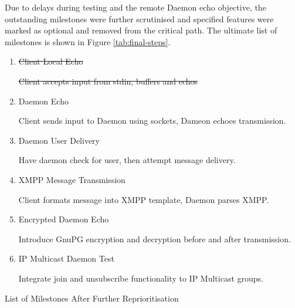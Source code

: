 Due to delays during testing and the remote Daemon echo objective, the 
outstanding milestones were further scrutinised and specified features
were marked as optional and removed from the critical path. The ultimate
list of milestones is shown in Figure \ref{tab:final-steps}.


\begin{table}[hbt]
\label{fig:final-steps}

\begin{center}

\begin{enumerate}

\item \sout{Client Local Echo}

	\subitem \sout{Client accepts input from stdin, buffers and echos}

\item Daemon Echo 

	\subitem Client sends input to Daemon using sockets, Dameon 
	echoes transmission.

\item Daemon User Delivery

	\subitem Have daemon check for user, then attempt message delivery.

\item XMPP Message Transmission 

	\subitem Client formats message into XMPP template, Daemon parses
	XMPP.

\item Encrypted Daemon Echo 

	\subitem Introduce GnuPG encryption and decryption before and after 
	transmission.

\item IP Multicast Daemon Test

	\subitem Integrate join and unsubscribe functionality to IP Multicast
	groups.

\end{enumerate}

\end{center}

\caption{List of Milestones After Further Reprioritisation}

\end{table}
